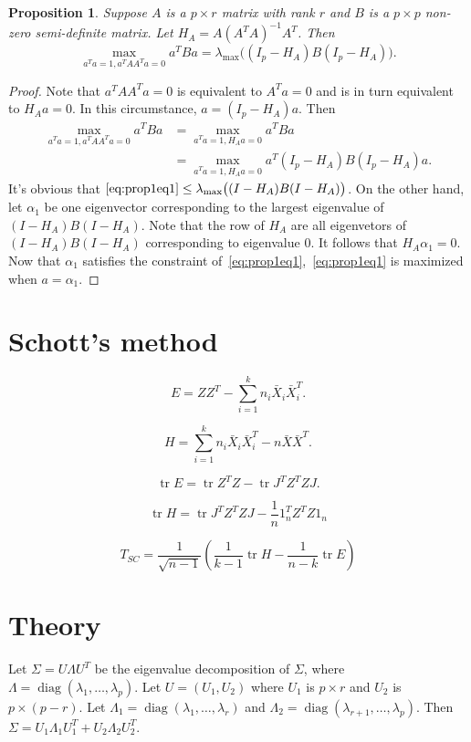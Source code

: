 \documentclass[review]{elsarticle}
\DeclareMathOperator{\mytr}{tr}
\DeclareMathOperator{\mydiag}{diag}
\theoremstyle{plain}
\newtheorem{proposition}{\quad\quad Proposition}
\theoremstyle{definition}
\theoremstyle{remark}
\begin{document}
\begin{proposition}\label{optProp}
    Suppose $A$ is a $p\times r$ matrix with rank $r$ and $B$ is a $p\times p$  non-zero semi-definite matrix.
    Let $H_A=A{(A^TA)}^{-1}A^T$.
    Then
    \begin{equation}
        \max_{a^T a=1, a^T A A^T a=0}a^T B a=
        \lambda_{\max}\big((I_p-H_A)B(I_p-H_A)\big).
    \end{equation}
\end{proposition}
\begin{proof}
    Note that $a^T A A^T a=0$ is equivalent to $A^T a=0$ and is in turn equivalent to $H_A a=0$.
    In this circumstance, $a= (I_p-H_A)a$.
    Then
    \begin{equation}\label{eq:prop1eq1}
        \begin{aligned}
        \max_{a^T a=1, a^T A A^T a=0}a^T B a
            &=
            \max_{a^T a=1, H_A a=0}a^T B a\\
            &=
        \max_{a^T a=1, H_A a=0}a^T(I_p-H_A) B (I_p-H_A)a.
        \end{aligned}
    \end{equation}
    It's obvious that $\eqref{eq:prop1eq1}\leq\lambda_{\max}\big((I-H_A)B(I-H_A)\big)$.
    On the other hand, let $\alpha_1$ be one eigenvector corresponding to the largest eigenvalue of $(I-H_A)B(I-H_A)$.
    Note that the row of $H_A$ are all eigenvetors of $(I-H_A)B(I-H_A)$ corresponding to eigenvalue $0$. It follows that $H_A\alpha_1=0$. Now that $\alpha_1$ satisfies the constraint of~\eqref{eq:prop1eq1},~\eqref{eq:prop1eq1} is maximized when $a=\alpha_1$.
    
\end{proof}

\section{Schott's method}

$$
E=ZZ^T-\sum_{i=1}^k n_i \bar{X}_i \bar{X}_i^T.
$$

$$
H=\sum_{i=1}^{k} n_i \bar{X}_i \bar{X}_i^T - n\bar{X}\bar{X}^T.
$$

$$
\mytr E = \mytr Z^T Z - \mytr J^T Z^T Z J.
$$


$$
\mytr H = \mytr J^T Z^T Z J - \frac{1}{n} 1_n^T Z^T Z 1_n
$$

$$
T_{SC}=\frac{1}{\sqrt{n-1}}(
\frac{1}{k-1}\mytr H-\frac{1}{n-k} \mytr E
)
$$


\section{Theory}
Let $\Sigma= U\Lambda U^T$ be the eigenvalue decomposition of $\Sigma$, where $\Lambda =\mydiag (\lambda_1,\ldots,\lambda_p)$.
Let $U=(U_1,U_2)$ where $U_1$ is $p\times r$ and $U_2$ is $p\times (p-r)$. Let $\Lambda_1=\mydiag(\lambda_1,\ldots,\lambda_r)$ and $\Lambda_2=\mydiag(\lambda_{r+1},\ldots,\lambda_p)$.
Then $\Sigma=U_1\Lambda_1 U_1^T+U_2\Lambda_2 U_2^T$.
\end{document}
